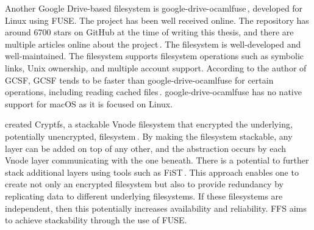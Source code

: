 Another Google \mbox{Drive-based} filesystem is \mbox{google-drive-ocamlfuse}\,\cite{stradaGoogledriveocamlfuse2022}, developed for Linux using \gls{FUSE}. The project has been well received online. The repository has around \num{6700} stars on GitHub at the time of writing this thesis, and there are multiple articles online about the project\,\cite{guoanInstallGoogleDrive2021,sneddonMountYourGoogle2017,aminUseGoogleDrive2021}. The filesystem is well-developed and well-maintained. The filesystem supports filesystem operations such as symbolic links, Unix ownership, and multiple account support. According to the author of \gls{GCSF}, \gls{GCSF} tends to be faster than \mbox{google-drive-ocamlfuse} for certain operations, including reading cached files\,\cite{sergiudanShortGCSFTends2018,puscassergiudanShowHNGoogle2018}. \mbox{google-drive-ocamlfuse} has no native support for macOS as it is focused on Linux. 

\citeauthor{zadokCryptfsStackableVnode1998} created Cryptfs, a stackable Vnode filesystem that encrypted the underlying, potentially unencrypted, filesystem\,\cite{zadokCryptfsStackableVnode1998}. By making the filesystem stackable, any layer can be added on top of any other, and the abstraction occurs by each Vnode layer communicating with the one beneath. There is a potential to further stack additional layers using tools such as FiST\,\cite{zadokFiSTStackableFile}. This approach enables one to create not only an encrypted filesystem but also to provide redundancy by replicating data to different underlying filesystems. If these filesystems are independent, then this potentially increases availability and reliability. \gls{FFS} aims to achieve stackability through the use of \gls{FUSE}. 

%
